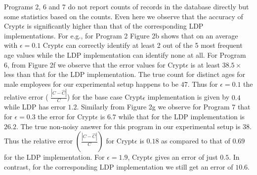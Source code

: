 Programs 2, 6 and 7 do not report counts of records in the database directly but some statistics based on the counts. Even here we observe that the accuracy of Crypt$\epsilon$ is significantly higher than that of the corresponding \textsf{LDP} implementations. For e.g., for Program 2 Figure 2b shows that on an average with $\epsilon=0.1$ Crypt$\epsilon$ can correctly identify at least 2 out of the 5 most frequent age values while the \textsf{LDP} implementation can identify none at all.  For Program 6, from Figure 2f we observe that the error values for Crypt$\epsilon$ is at least $38.5 \times$ less than that for the \textsf{LDP} implementation. The true count for distinct ages for male employees for our experimental setup happens to be $47$. Thus for $\epsilon=0.1$ the relative error ( $\frac{|C-\hat{C}|}{C}$) for the base case Crypt$\epsilon$ implementation is given by  $0.4$ while \textsf{LDP} has error $1.2$. Similarly from Figure 2g we observe for Program 7 that for $\epsilon=0.3$ the error for Crypt$\epsilon$ is $6.7$ while that for the \textsf{LDP} implementation is $26.2$. The true non-noisy answer for this program in our experimental setup is $38$. Thus the relative error $(\frac{|C-\hat{C}|}{C})$ for Crypt$\epsilon$ is $0.18$ as compared to that of $0.69$ for the \textsf{LDP} implementation.  For $\epsilon=1.9$, Crypt$\epsilon$ gives an error of just $0.5$. In contrast,  for the corresponding \textsf{LDP} implementation we still get an error of $10.6$. 
